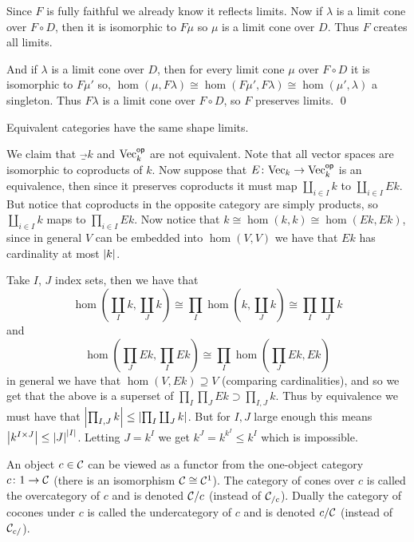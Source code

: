     Since $F$ is fully faithful we already know it reflects limits.
    Now if $\lambda$ is a limit cone over $F\circ D$, then it is isomorphic to $F\mu$ so $\mu$ is a limit cone over $D$.
    Thus $F$ creates all limits.

    And if $\lambda$ is a limit cone over $D$, then for every limit cone $\mu$ over $F\circ D$ it is isomorphic to $F\mu'$ so, $\hom(\mu,F\lambda)\cong\hom(F\mu',F\lambda)\cong\hom(\mu',\lambda)$
    a singleton.
    Thus $F\lambda$ is a limit cone over $F\circ D$, so $F$ preserves limits.
    \qed

\eproof

\bcoro

    Equivalent categories have the same shape limits.

\ecoro

\bexam

    We claim that $\Vec_k$ and ${\rm Vec}_k^{\sf op}$ are not equivalent.
    Note that all vector spaces are isomorphic to coproducts of $k$.
    Now suppose that $E\colon{\rm Vec}_k\to{\rm Vec}_k^{\sf op}$ is an equivalence, then since it preserves coproducts it must map $\coprod_{i\in I}k$ to $\coprod_{i\in I}Ek$.
    But notice that coproducts in the opposite category are simply products, so $\coprod_{i\in I}k$ maps to $\prod_{i\in I}Ek$.
    Now notice that $k\cong\hom(k,k)\cong\hom(Ek,Ek)$, since in general $V$ can be embedded into $\hom(V,V)$ we have that $Ek$ has cardinality at most $\mathopen{}\mathclose{\left|k\right|}$.

    Take $I$, $J$ index sets, then we have that
    $$ \hom(\coprod_Ik,\coprod_Jk) \cong \prod_I\hom(k,\coprod_Jk) \cong \prod_I\coprod_Jk $$
    and
    $$ \hom(\prod_JEk,\prod_IEk) \cong \prod_I\hom(\prod_JEk,Ek) $$
    in general we have that $\hom(V,Ek)\supseteq V$ (comparing cardinalities), and so we get that the above is a superset of $\prod_I\prod_JEk\supset\prod_{I,J}k$.
    Thus by equivalence we must have that $\mathopen{}\mathclose{\left|\prod_{I,J}k\right|}\leq\mathopen{}\mathclose{\left|\prod_I\coprod_Jk\right|}$.
    But for $I,J$ large enough this means $\mathopen{}\mathclose{\left|k^{I\times J}\right|}\leq\mathopen{}\mathclose{\left|J\right|}^{\mathopen{}\mathclose{\left|I\right|}}$.
    Letting $J=k^I$ we get $k^J=k^{k^I}\leq k^I$ which is impossible.

\eexam

\bdefn

    An object $c\in{{\cal C}}$ can be viewed as a functor from the one-object category $c\colon1\to{{\cal C}}$ (there is an isomorphism ${{\cal C}}\cong{{\cal C}}^1$).
    The category of cones over $c$ is called the {\emphcolor overcategory} of $c$ and is denoted ${{\cal C}}/c$ (instead of ${{\cal C}}_{/c}$).
    Dually the category of cocones under $c$ is called the {\emphcolor undercategory} of $c$ and is denoted $c/{{\cal C}}$ (instead of ${{\cal C}}_{c/}$).

